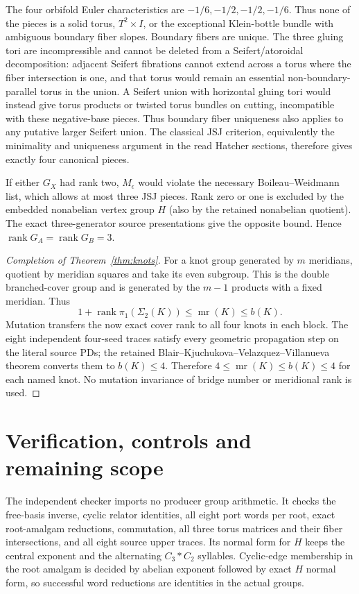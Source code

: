 \documentclass[11pt]{article}
\newcommand{\rank}{\operatorname{rank}}
\newcommand{\mr}{\operatorname{mr}}
\begin{document}
The four orbifold Euler characteristics are
$-1/6,-1/2,-1/2,-1/6$. Thus none of the pieces is a solid torus,
$T^2\times I$, or the exceptional Klein-bottle bundle with ambiguous
boundary fiber slopes. Boundary fibers are unique. The three gluing
tori are incompressible and cannot be deleted from a Seifert/atoroidal
decomposition: adjacent Seifert fibrations cannot extend across a torus
where the fiber intersection is one, and that torus would remain an
essential non-boundary-parallel torus in the union. A Seifert union with
horizontal gluing tori would instead give torus products or twisted
torus bundles on cutting, incompatible with these negative-base pieces.
Thus boundary fiber uniqueness also applies to any putative larger
Seifert union. The classical JSJ criterion, equivalently the minimality
and uniqueness argument in the
read Hatcher sections, therefore gives exactly four canonical pieces.

If either $G_X$ had rank two, $M_\epsilon$ would violate the necessary
Boileau--Weidmann list, which allows at most three JSJ pieces. Rank zero
or one is excluded by the embedded nonabelian vertex group $H$ (also
by the retained nonabelian quotient). The exact three-generator source
presentations give the opposite bound. Hence $\rank G_A=\rank G_B=3$.

\begin{proof}[Completion of Theorem~\ref{thm:knots}]
For a knot group generated by $m$ meridians, quotient by meridian squares
and take its even subgroup. This is the double branched-cover group
and is generated by the $m-1$ products with a fixed meridian. Thus
\[
 1+\rank\pi_1(\Sigma_2(K))\le\mr(K)\le b(K).
\]
Mutation transfers the now exact cover rank to all four knots in each
block. The eight independent four-seed traces satisfy every geometric
propagation step on the literal source PDs; the retained
Blair--Kjuchukova--Velazquez--Villanueva theorem converts them to
$b(K)\le4$. Therefore $4\le\mr(K)\le b(K)\le4$ for each named knot.
No mutation invariance of bridge number or meridional rank is used.
\end{proof}

\section{Verification, controls and remaining scope}

The independent checker imports no producer group arithmetic. It checks
the free-basis inverse, cyclic relator identities, all eight port words
per root, exact root-amalgam reductions, commutation, all three torus
matrices and their fiber intersections, and all eight source upper traces.
Its normal form for $H$ keeps the central exponent and the alternating
$C_3*C_2$ syllables. Cyclic-edge membership in the root amalgam is decided
by abelian exponent followed by exact $H$ normal form, so successful
word reductions are identities in the actual groups.
\end{document}
